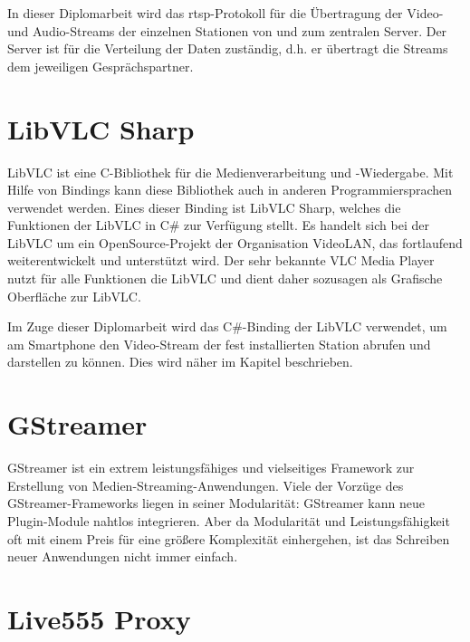 In dieser Diplomarbeit wird das \ac{rtsp}-Protokoll für die Übertragung der Video- und Audio-Streams der einzelnen Stationen von und zum zentralen Server.
Der Server ist für die Verteilung der Daten zuständig, d.h. er übertragt die Streams dem jeweiligen Gesprächspartner.



\section{LibVLC Sharp}
LibVLC ist eine C-Bibliothek für die Medienverarbeitung und -Wiedergabe.
Mit Hilfe von Bindings kann diese Bibliothek auch in anderen Programmiersprachen verwendet werden.
Eines dieser Binding ist LibVLC Sharp, welches die Funktionen der LibVLC in C\# zur Verfügung stellt.
Es handelt sich bei der LibVLC um ein OpenSource-Projekt der Organisation VideoLAN, das fortlaufend weiterentwickelt und unterstützt wird. Der sehr bekannte VLC Media Player nutzt für alle Funktionen die LibVLC und dient daher sozusagen als Grafische Oberfläche zur LibVLC. \cite[vgl.][]{libvlc}\par

Im Zuge dieser Diplomarbeit wird das C\#-Binding der LibVLC verwendet, um am Smartphone den Video-Stream der fest installierten Station abrufen und darstellen zu können.
Dies wird näher im Kapitel  beschrieben.

\section{GStreamer}
GStreamer ist ein extrem leistungsfähiges und vielseitiges Framework zur Erstellung von Medien-Streaming-Anwendungen.
Viele der Vorzüge des GStreamer-Frameworks liegen in seiner Modularität:
GStreamer kann neue Plugin-Module nahtlos integrieren.
Aber da Modularität und Leistungsfähigkeit oft mit einem Preis für eine größere Komplexität einhergehen, ist das Schreiben neuer Anwendungen nicht immer einfach.
\cite[aus dem Englischen übersetzt]{gstreamer}

\section{Live555 Proxy}